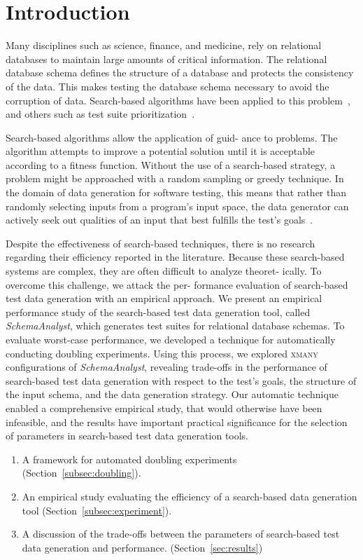 \section{Introduction}

Many disciplines such as science, finance, and medicine,
rely on relational databases to maintain large amounts
of critical information. The relational database schema
defines the structure of a database and protects the
consistency of the data. This makes testing the database
schema necessary to avoid the corruption of data. Search-based
algorithms have been applied to this problem~\cite{Kapfhammer2013}, and
others such as test suite prioritization~\cite{Walcott:tsp}.

Search-based algorithms allow the application of guid-
ance to problems. The algorithm attempts to improve
a potential solution until it is acceptable according to
a fitness function. Without the use of a search-based
strategy, a problem might be approached with a random
sampling or greedy technique. In the domain of data
generation for software testing, this means that rather
than randomly selecting inputs from a program’s input
space, the data generator can actively seek out qualities
of an input that best fulfills the test’s goals~\cite{McMinn2004a}.

Despite the effectiveness of search-based techniques,
there is no research regarding their efficiency reported
in the literature. Because these search-based systems
are complex, they are often difficult to analyze theoret-
ically. To overcome this challenge, we attack the per-
formance evaluation of search-based test data generation
with an empirical approach. We present an empirical performance
study of the search-based test data generation tool, called
\textit{SchemaAnalyst}, which generates test suites for relational
database schemas. To evaluate worst-case performance,
we developed a technique for automatically conducting
doubling experiments. Using this process, we explored \textsc{xmany} 
configurations of \textit{SchemaAnalyst}, revealing trade-offs
in the performance of search-based test data generation
with respect to the test’s goals, the structure of the
input schema, and the data generation strategy. Our
automatic technique enabled a comprehensive empirical
study, that would otherwise have been infeasible, and the results
have important practical significance for the selection of
parameters in search-based test data generation tools.

\begin{enumerate}
  \item A framework for automated doubling experiments
    (Section~\ref{subsec:doubling}).
  \item An empirical study evaluating the efficiency of a search-based
    data generation tool (Section~\ref{subsec:experiment}).
  \item A discussion of the trade-offs between the parameters of
    search-based test data generation and performance.  
    (Section~\ref{sec:results})
  \end{enumerate}
